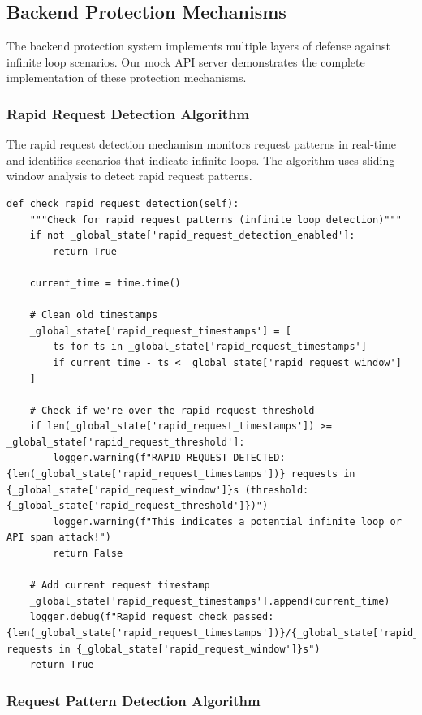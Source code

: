 \documentclass[10pt]{article}
\begin{document}
\subsection{Backend Protection Mechanisms}

The backend protection system implements multiple layers of defense against infinite loop scenarios. Our mock API server demonstrates the complete implementation of these protection mechanisms.

\subsubsection{Rapid Request Detection Algorithm}

The rapid request detection mechanism monitors request patterns in real-time and identifies scenarios that indicate infinite loops. The algorithm uses sliding window analysis to detect rapid request patterns.

\begin{lstlisting}[caption={Rapid Request Detection Implementation}]
def check_rapid_request_detection(self):
    """Check for rapid request patterns (infinite loop detection)"""
    if not _global_state['rapid_request_detection_enabled']:
        return True
        
    current_time = time.time()
    
    # Clean old timestamps
    _global_state['rapid_request_timestamps'] = [
        ts for ts in _global_state['rapid_request_timestamps'] 
        if current_time - ts < _global_state['rapid_request_window']
    ]
    
    # Check if we're over the rapid request threshold
    if len(_global_state['rapid_request_timestamps']) >= _global_state['rapid_request_threshold']:
        logger.warning(f"RAPID REQUEST DETECTED: {len(_global_state['rapid_request_timestamps'])} requests in {_global_state['rapid_request_window']}s (threshold: {_global_state['rapid_request_threshold']})")
        logger.warning(f"This indicates a potential infinite loop or API spam attack!")
        return False
    
    # Add current request timestamp
    _global_state['rapid_request_timestamps'].append(current_time)
    logger.debug(f"Rapid request check passed: {len(_global_state['rapid_request_timestamps'])}/{_global_state['rapid_request_threshold']} requests in {_global_state['rapid_request_window']}s")
    return True
\end{lstlisting}

\subsubsection{Request Pattern Detection Algorithm}
\end{document}
